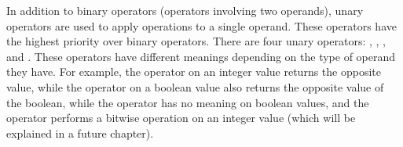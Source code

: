 In addition to binary operators (operators involving two operands), unary
operators are used to apply operations to a single operand. These operators have
the highest priority over binary operators. There are four unary operators:
\token{-}, \token{&}, \token{*}, and \token{!}. These operators
have different meanings depending on the type of operand they have. For example,
the \token{-} operator on an integer value returns the opposite value, while
the \token{!} operator on a boolean value also returns the opposite value of
the boolean, while the \token{-} operator has no meaning on boolean values,
and the \token{!} operator performs a bitwise operation on an integer value
(which will be explained in a future chapter).
